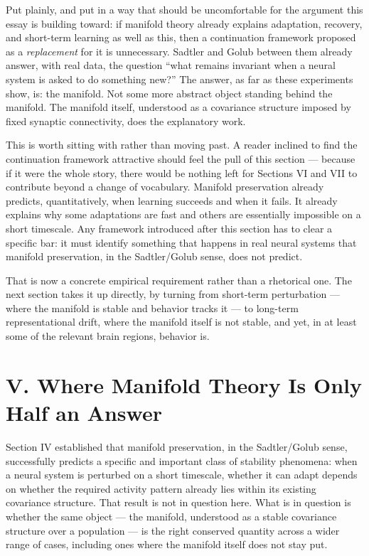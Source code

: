 \documentclass[11pt]{article}
\begin{document}
Put plainly, and put in a way that should be uncomfortable for the argument this essay is building toward: if manifold theory already explains adaptation, recovery, and short-term learning as well as this, then a continuation framework proposed as a \textit{replacement} for it is unnecessary. Sadtler and Golub between them already answer, with real data, the question ``what remains invariant when a neural system is asked to do something new?'' The answer, as far as these experiments show, is: the manifold. Not some more abstract object standing behind the manifold. The manifold itself, understood as a covariance structure imposed by fixed synaptic connectivity, does the explanatory work.

This is worth sitting with rather than moving past. A reader inclined to find the continuation framework attractive should feel the pull of this section — because if it were the whole story, there would be nothing left for Sections VI and VII to contribute beyond a change of vocabulary. Manifold preservation already predicts, quantitatively, when learning succeeds and when it fails. It already explains why some adaptations are fast and others are essentially impossible on a short timescale. Any framework introduced after this section has to clear a specific bar: it must identify something that happens in real neural systems that manifold preservation, in the Sadtler/Golub sense, does not predict.

That is now a concrete empirical requirement rather than a rhetorical one. The next section takes it up directly, by turning from short-term perturbation — where the manifold is stable and behavior tracks it — to long-term representational drift, where the manifold itself is not stable, and yet, in at least some of the relevant brain regions, behavior is.
\section*{V. Where Manifold Theory Is Only Half an Answer}

Section IV established that manifold preservation, in the Sadtler/Golub sense, successfully predicts a specific and important class of stability phenomena: when a neural system is perturbed on a short timescale, whether it can adapt depends on whether the required activity pattern already lies within its existing covariance structure. That result is not in question here. What is in question is whether the same object — the manifold, understood as a stable covariance structure over a population — is the right conserved quantity across a wider range of cases, including ones where the manifold itself does not stay put.
\end{document}
